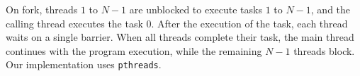   On fork, threads $1$ to $N-1$ are unblocked to execute tasks $1$ to
  $N-1$, and the calling thread executes the task $0$.  After the
  execution of the task, each thread waits on a single barrier.  When
  all threads complete their task, the main thread continues with the
  program execution, while the remaining $N-1$ threads block.  Our
  implementation uses \texttt{pthreads}.

